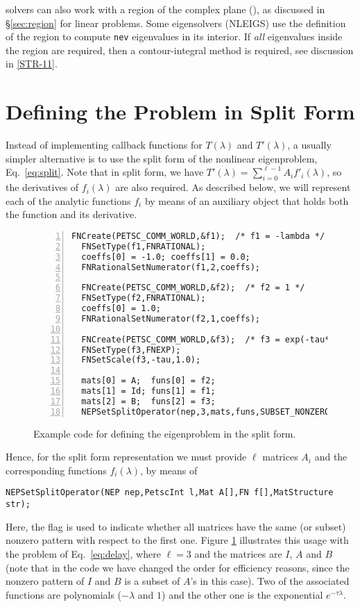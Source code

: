  solvers can also work with a region of the complex plane (), as discussed in \S\ref{sec:region} for linear problems. Some eigensolvers (NLEIGS) use the definition of the region to compute \texttt{nev} eigenvalues in its interior. If \emph{all} eigenvalues inside the region are required, then a contour-integral method is required, see discussion in \hyperlink{str}{[STR-11]}.

\section{\label{sec:nepsplit}Defining the Problem in Split Form}

Instead of implementing callback functions for $T(\lambda)$ and $T'(\lambda)$, a usually simpler alternative is to use the split form of the nonlinear eigenproblem, Eq.\ \ref{eq:split}. Note that in split form, we have $T'(\lambda)=\sum_{i=0}^{\ell-1}A_if'_i(\lambda)$, so the derivatives of $f_i(\lambda)$ are also required. As described below, we will represent each of the analytic functions $f_i$ by means of an auxiliary object  that holds both the function and its derivative.

\begin{figure}
\begin{Verbatim}[fontsize=\small,numbers=left,numbersep=6pt,xleftmargin=15mm]
  FNCreate(PETSC_COMM_WORLD,&f1);  /* f1 = -lambda */
  FNSetType(f1,FNRATIONAL);
  coeffs[0] = -1.0; coeffs[1] = 0.0;
  FNRationalSetNumerator(f1,2,coeffs);

  FNCreate(PETSC_COMM_WORLD,&f2);  /* f2 = 1 */
  FNSetType(f2,FNRATIONAL);
  coeffs[0] = 1.0;
  FNRationalSetNumerator(f2,1,coeffs);

  FNCreate(PETSC_COMM_WORLD,&f3);  /* f3 = exp(-tau*lambda) */
  FNSetType(f3,FNEXP);
  FNSetScale(f3,-tau,1.0);

  mats[0] = A;  funs[0] = f2;
  mats[1] = Id; funs[1] = f1;
  mats[2] = B;  funs[2] = f3;
  NEPSetSplitOperator(nep,3,mats,funs,SUBSET_NONZERO_PATTERN);
\end{Verbatim}
\caption{\label{fig:ex-split}Example code for defining the  eigenproblem in the split form.}
\end{figure}

Hence, for the split form representation we must provide $\ell$ matrices $A_i$ and the corresponding functions $f_i(\lambda)$, by means of%
	\begin{Verbatim}[fontsize=\small]
	NEPSetSplitOperator(NEP nep,PetscInt l,Mat A[],FN f[],MatStructure str);
	\end{Verbatim}
Here, the  flag is used to indicate whether all matrices have the same (or subset) nonzero pattern with respect to the first one.
Figure \ref{fig:ex-split} illustrates this usage with the problem of Eq.\ \ref{eq:delay}, where $\ell=3$ and the matrices are $I$, $A$ and $B$ (note that in the code we have changed the order for efficiency reasons, since the nonzero pattern of $I$ and $B$ is a subset of $A$'s in this case). Two of the associated functions are polynomials ($-\lambda$ and $1$) and the other one is the exponential $e^{-\tau\lambda}$.

